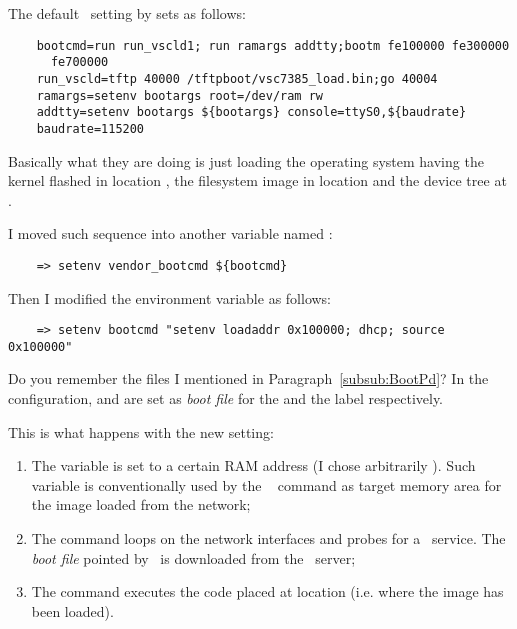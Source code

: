         The default \uBoot\ setting by  sets
         as follows:
\begin{lstlisting}
    bootcmd=run run_vscld1; run ramargs addtty;bootm fe100000 fe300000
      fe700000
    run_vscld=tftp 40000 /tftpboot/vsc7385_load.bin;go 40004 
    ramargs=setenv bootargs root=/dev/ram rw
    addtty=setenv bootargs ${bootargs} console=ttyS0,${baudrate}
    baudrate=115200
\end{lstlisting}

        Basically what they are doing is just loading the operating system
        having the kernel flashed in location , the
        filesystem image in location  and the device
        tree at .

        I moved such sequence into another variable named
        :
\begin{lstlisting}
    => setenv vendor_bootcmd ${bootcmd}
\end{lstlisting}
    Then I modified the  environment variable as follows:
\begin{lstlisting}
    => setenv bootcmd "setenv loadaddr 0x100000; dhcp; source 0x100000"
\end{lstlisting}

        Do you remember the files I mentioned in
        Paragraph~\ref{subsub:BootPd}? In the 
        configuration,  and
         are set as \emph{boot file} for the
         and the  label respectively.

        This is what happens with the new setting:
        \begin{enumerate}
        \item   The  variable is set to a certain RAM
                address (I chose arbitrarily ). Such
                variable is conventionally used by the \uBoot\
                 command as target memory area for the image
                loaded from the network;
        \item   The  command loops on the network interfaces
                and probes for a \BootP\ service. The \emph{boot file}
                pointed by \BootP\ is downloaded from the \TFTP\ server;
        \item   The \Command{source} command executes the code placed at
                location \Const{0x100000} (i.e. where the image has been
                loaded).
        \end{enumerate}

